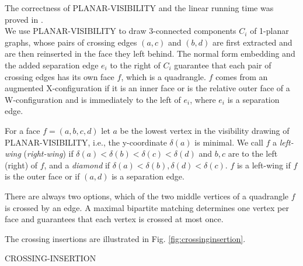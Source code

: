 \documentclass[runningheads]{llncs}
\begin{document}
 The correctness of  PLANAR-VISIBILITY and the linear
running time was proved in
\cite{dett-gdavg-99,rt-rplbopg-86, TT-vrpg-86}.\\



We use PLANAR-VISIBILITY to draw 3-connected components $C_i$ of
1-planar graphs, whose pairs of crossing edges $(a,c)$ and $(b,d)$
are first extracted  and are then  reinserted in the face they left
behind. The normal form embedding and the added separation edge
$e_i$ to the right of $C_i$ guarantee that each pair of crossing
edges has its own face $f$, which is a quadrangle. $f$ comes from an
augmented X-configuration if it is an inner face or is the relative
outer face of a W-configuration and is immediately to the left of
$e_i$, where   $e_i$ is a separation edge.

For a face $f=(a,b,c,d)$ let
 $a$ be the lowest vertex in the visibility drawing of PLANAR-VISIBILITY,
 i.e., the y-coordinate $\delta(a)$ is minimal. We call
$f$ a \emph{left-wing} (\emph{right-wing}) if $\delta(a) < \delta(b)
< \delta(c) < \delta(d)$ and $b,c$  are to the left (right) of  $f$,
and a \emph{diamond} if $\delta(a) < \delta(b), \delta(d) <
\delta(c)$. $f$ is a left-wing if $f$ is the outer face or if
$(a,d)$ is a separation edge.

There are always two options, which of the two middle vertices of a
quadrangle  $f$ is crossed by an edge. A maximal bipartite matching
determines one vertex per face and guarantees that each vertex is
crossed at most once.

The crossing insertions are illustrated in Fig.
\ref{fig:crossinginsertion}.







\begin{algorithm}
  \caption{CROSSING-INSERTION}\label{alg:crossing-insertion}

\end{algorithm}
\end{document}
